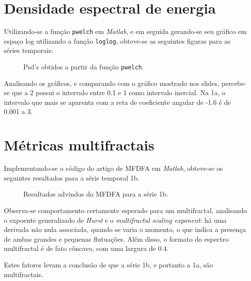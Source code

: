 \documentclass{article}[twocolumn]
\begin{document}
	\section{Densidade espectral de energia}
	Utilizando-se a fun\c{c}\~ao \texttt{pwelch} em \textit{Matlab}, e em seguida gerando-se
	seu gr\'afico em espa\c{c}o log utilizando a fun\c{c}\~ao \texttt{loglog}, obteve-se as
	seguintes figuras para as s\'eries temporais:
	\begin{figure}[H]
		\centering
		\caption{Psd's obtidos a partir da fun\c{c}\~ao \texttt{pwelch}.}
	\end{figure}
	Analisando os gr\'aficos, e comparando com o gr\'afico mostrado nos slides, percebe-se que a
	2 possui o intervalo entre 0.1 e 1 como intervalo inercial. Na 1a, o intervalo que mais se
	aparenta com a reta de coeficiente angular de -1.6 \'e de 0.001 a 3.
	\section{M\'etricas multifractais}
	Implementando-se o c\'odigo do artigo de MFDFA em \textit{Matlab}, obteve-se os seguintes
	resultados para a s\'erie temporal 1b.
	\begin{figure}[H]
		\centering
		\caption{Resultados advindos do MFDFA para a s\'erie 1b.}
	\end{figure}
	Observa-se comportamento certamente esperado para um multifractal, analisando o expoente
	generalizado de \textit{Hurst} e o \textit{multifractal scaling exponent}: h\'a uma
	derivada n\~ao nula associada, quando se varia o momento, o que indica a presen\c{c}a
	de ambas grandes e pequenas flutua\c{c}\~oes. Al\'em disso, o formato do espectro
	multifractal \'e de fato c\^oncavo, com uma largura de 0.4.

	Estes fatores levam a conclus\~ao de que a s\'erie 1b, e portanto a 1a, s\~ao multifractais.
\end{document}
